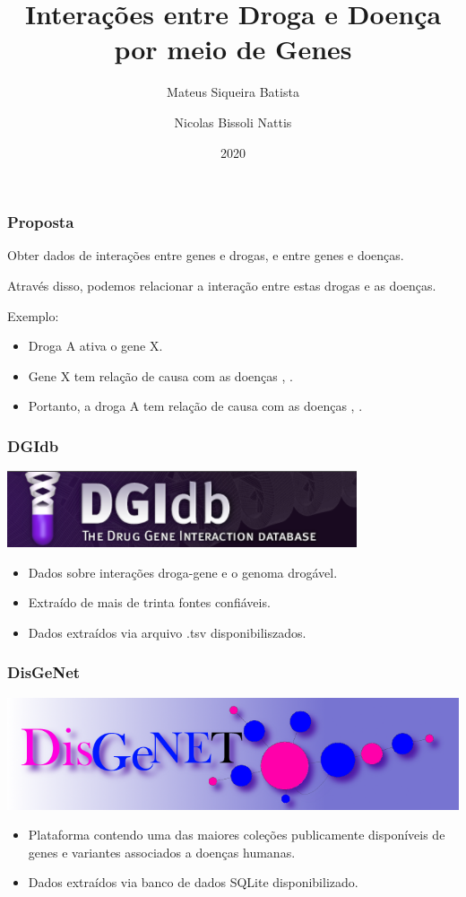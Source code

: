 \documentclass[12pt]{beamer}
\title{Interações entre Droga e Doença por meio de Genes}
\author{
  Mateus Siqueira Batista\and
  Nicolas Bissoli Nattis
}
\institute{
  MC536 - Instituto de Computação, UNICAMP
}
\date[2020]{2020}
\begin{document}
\frame{\titlepage}

\begin{frame}
  \frametitle{Proposta}
  Obter dados de interações entre genes e drogas, e entre genes e doenças.
  \pause

  Através disso, podemos relacionar a interação entre estas drogas e as doenças.
  \pause

  \begin{block}{Exemplo:}
    \begin{itemize}
      \item Droga A ativa o gene X.
      \item Gene X tem relação de causa com as doenças \textalpha, \textgamma.
      \item Portanto, a droga A tem relação de causa com as doenças \textalpha, \textgamma.
    \end{itemize}
  \end{block}
\end{frame}

\begin{frame}
  \frametitle{DGIdb}
  \centering
  \includegraphics[scale=0.5]{dgi}
  \vspace*{1 cm}
  \begin{itemize}
    \item Dados sobre interações droga-gene e o genoma drogável.
    \item Extraído de mais de trinta fontes confiáveis.
    \item Dados extraídos via arquivo .tsv disponibiliszados.
  \end{itemize}
\end{frame}

\begin{frame}
  \frametitle{DisGeNet}
  \centering
  \includegraphics[scale=0.25]{disgenet}
  \vspace*{1 cm}
  \begin{itemize}
    \item Plataforma contendo uma das maiores coleções publicamente disponíveis
          de genes e variantes associados a doenças humanas.
    \item Dados extraídos via banco de dados SQLite disponibilizado.
  \end{itemize}
\end{frame}
\end{document}
